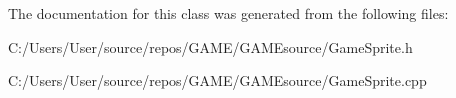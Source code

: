 The documentation for this class was generated from the following files\+:\begin{DoxyCompactItemize}
\item 
C\+:/\+Users/\+User/source/repos/\+G\+A\+M\+E/\+G\+A\+M\+Esource/Game\+Sprite.\+h\item 
C\+:/\+Users/\+User/source/repos/\+G\+A\+M\+E/\+G\+A\+M\+Esource/Game\+Sprite.\+cpp\end{DoxyCompactItemize}
